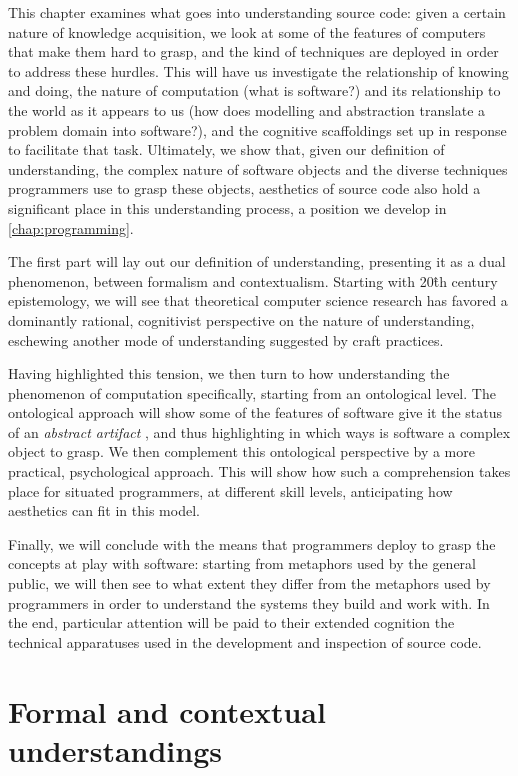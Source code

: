 This chapter examines what goes into understanding source code: given a certain nature of knowledge acquisition, we look at some of the features of computers that make them hard to grasp, and the kind of techniques are deployed in order to address these hurdles. This will have us investigate the relationship of knowing and doing, the nature of computation (what is software?) and its relationship to the world as it appears to us (how does modelling and abstraction translate a problem domain into software?), and the cognitive scaffoldings set up in response to facilitate that task. Ultimately, we show that, given our definition of understanding, the complex nature of software objects and the diverse techniques programmers use to grasp these objects, aesthetics of source code also hold a significant place in this understanding process, a position we develop in \ref{chap:programming}.

The first part will lay out our definition of understanding, presenting it as a dual phenomenon, between formalism and contextualism. Starting with 20\^{th} century epistemology, we will see that theoretical computer science research has favored a dominantly rational, cognitivist perspective on the nature of understanding, eschewing another mode of understanding suggested by craft practices.

Having highlighted this tension, we then turn to how understanding the phenomenon of computation specifically, starting from an ontological level. The ontological approach will show some of the features of software give it the status of an \emph{abstract artifact} \citep{irmak_software_2012}, and thus highlighting in which ways is software a complex object to grasp. We then complement this ontological perspective by a more practical, psychological approach. This will show how such a comprehension takes place for situated programmers, at different skill levels, anticipating how aesthetics can fit in this model.

Finally, we will conclude with the means that programmers deploy to grasp the concepts at play with software: starting from metaphors used by the general public, we will then see to what extent they differ from the metaphors used by programmers in order to understand the systems they build and work with. In the end, particular attention will be paid to their extended cognition the technical apparatuses used in the development and inspection of source code.

\section{Formal and contextual understandings}
\label{sec:formal-contextual-understandings}

